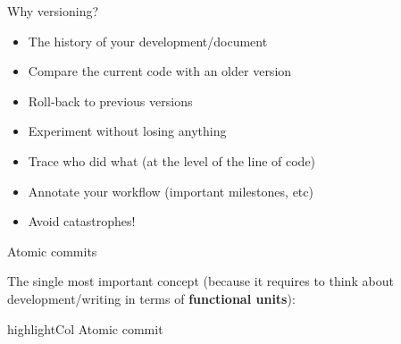 \documentclass[compress]{beamer}
\newcommand{\highlight}[1]{%
    \vspace{1em}%
    \begin{beamercolorbox}[wd=\linewidth,ht=2ex,dp=0.7ex]{highlightCol}%
    \centering #1%
    \end{beamercolorbox}%
    \vspace{1em}%
}%
\begin{document}
\begin{frame}{Why versioning?}

    \begin{itemize}
        \item The history of your development/document
        \item Compare the current code with an older version
        \item Roll-back to previous versions
        \item Experiment without losing anything
        \item Trace who did what (at the level of the line of code)
        \item Annotate your workflow (important milestones, etc)
        \item Avoid catastrophes!
    \end{itemize}
\end{frame}

\begin{frame}{Atomic commits}

    The single most important concept (because it requires to think about
    development/writing in terms of {\bf functional units}):

    \highlight{Atomic commit}


\end{frame}
\end{document}
